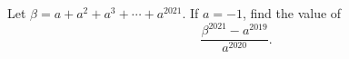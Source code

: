 Let $\beta=a+a^2+a^3+\cdots+a^{2021}$. If $a=-1$, find the value of
\[\dfrac{\beta^{2021}-a^{2019}}{a^{2020}}.\]
